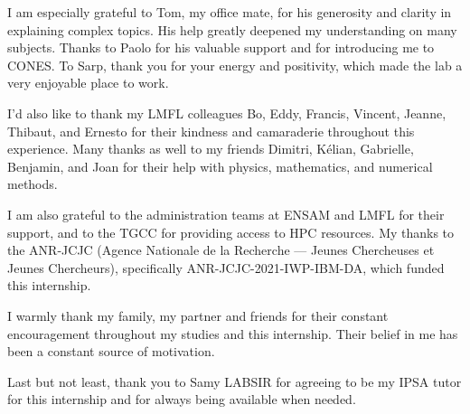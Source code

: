 I am especially grateful to Tom, my office mate, for his generosity and clarity in explaining complex topics. His help greatly deepened my understanding on many subjects.  
Thanks to Paolo for his valuable support and for introducing me to CONES.
To Sarp, thank you for your energy and positivity, which made the lab a very enjoyable place to work.

I'd also like to thank my LMFL colleagues Bo, Eddy, Francis, Vincent, Jeanne, Thibaut, and Ernesto for their kindness and camaraderie throughout this experience.
Many thanks as well to my friends Dimitri, Kélian, Gabrielle, Benjamin, and Joan for their help with physics, mathematics, and numerical methods.

I am also grateful to the administration teams at ENSAM and LMFL for their support, and to the TGCC for providing access to HPC resources.  
My thanks to the ANR-JCJC (Agence Nationale de la Recherche — Jeunes Chercheuses et Jeunes Chercheurs),
specifically ANR-JCJC-2021-IWP-IBM-DA, which funded this internship.

I warmly thank my family, my partner and friends for their constant encouragement throughout my studies and this internship. Their belief in me has been a constant source of motivation.

Last but not least, thank you to Samy LABSIR for agreeing to be my IPSA tutor for this internship and for always being available when needed.


